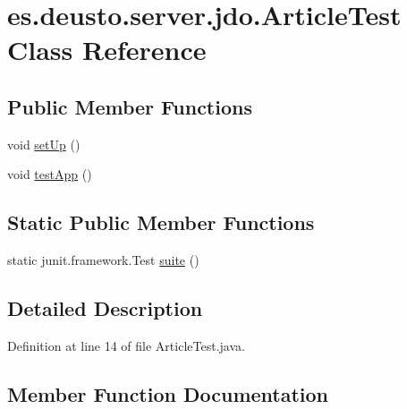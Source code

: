 \hypertarget{classes_1_1deusto_1_1server_1_1jdo_1_1_article_test}{}\section{es.\+deusto.\+server.\+jdo.\+Article\+Test Class Reference}
\label{classes_1_1deusto_1_1server_1_1jdo_1_1_article_test}
\subsection*{Public Member Functions}
\begin{DoxyCompactItemize}
\item 
void \hyperlink{classes_1_1deusto_1_1server_1_1jdo_1_1_article_test_ab0cc0b9782956ac1efdc0c71aae00b50}{set\+Up} ()
\item 
void \hyperlink{classes_1_1deusto_1_1server_1_1jdo_1_1_article_test_aebd6492407d7e7c8cb5d5d848a215b32}{test\+App} ()
\end{DoxyCompactItemize}
\subsection*{Static Public Member Functions}
\begin{DoxyCompactItemize}
\item 
static junit.\+framework.\+Test \hyperlink{classes_1_1deusto_1_1server_1_1jdo_1_1_article_test_a34b33e76c351fad2110b14191ad00c6b}{suite} ()
\end{DoxyCompactItemize}


\subsection{Detailed Description}


Definition at line 14 of file Article\+Test.\+java.



\subsection{Member Function Documentation}
\mbox{\label{classes_1_1deusto_1_1server_1_1jdo_1_1_article_test_ab0cc0b9782956ac1efdc0c71aae00b50}} 
